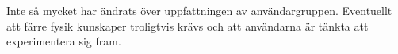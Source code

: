 Inte så mycket har ändrats över uppfattningen av användargruppen.
Eventuellt att färre fysik kunskaper troligtvis krävs och att användarna
är tänkta att experimentera sig fram.

